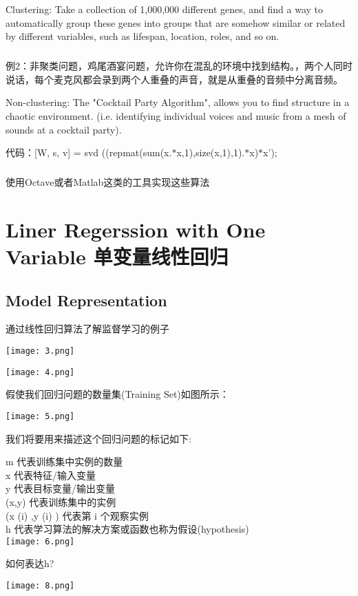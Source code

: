 \documentclass{article}
\begin{document}
\begin{CJK}{UTF8}{gbsn}
Clustering: Take a collection of 1,000,000 different genes, and find a way to automatically group these genes into groups that are somehow similar or related by different variables, such as lifespan, location, roles, and so on.
\subparagraph*{}
例2：非聚类问题，鸡尾酒宴问题，允许你在混乱的环境中找到结构。，两个人同时说话，每个麦克风都会录到两个人重叠的声音，就是从重叠的音频中分离音频。

Non-clustering: The "Cocktail Party Algorithm", allows you to find structure in a chaotic environment. (i.e. identifying individual voices and music from a mesh of sounds at a cocktail party).

代码：[W, s, v] = svd ((repmat(sum(x.$*$x,1),size(x,1),1).$*$x)$*$x');
\subparagraph*{}
使用Octave或者Matlab这类的工具实现这些算法
\newpage

\section{Liner Regerssion with One Variable 单变量线性回归}
\subsection{Model Representation}
通过线性回归算法了解监督学习的例子

\texttt{[image: 3.png]}

\texttt{[image: 4.png]}

假使我们回归问题的数量集(Training Set)如图所示：

\texttt{[image: 5.png]}

我们将要用来描述这个回归问题的标记如下:

m 代表训练集中实例的数量\\

x 代表特征/输入变量\\

y 代表目标变量/输出变量\\

(x,y) 代表训练集中的实例\\

(x (i) ,y (i) ) 代表第 i 个观察实例\\

h 代表学习算法的解决方案或函数也称为假设(hypothesis)\\

\texttt{[image: 6.png]}

如何表达h?

\texttt{[image: 8.png]}


\end{CJK}
\end{document}
